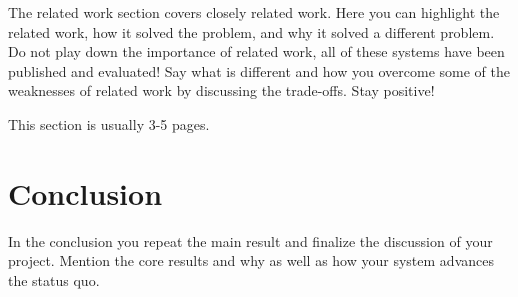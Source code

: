 \documentclass[a4paper,11pt,oneside]{report}
\begin{document}
The related work section covers closely related work. Here you can highlight
the related work, how it solved the problem, and why it solved a different
problem. Do not play down the importance of related work, all of these
systems have been published and evaluated! Say what is different and how
you overcome some of the weaknesses of related work by discussing the 
trade-offs. Stay positive!

This section is usually 3-5 pages.


\chapter{Conclusion}

In the conclusion you repeat the main result and finalize the discussion of
your project. Mention the core results and why as well as how your system
advances the status quo.

\cleardoublepage
{}
{}
\printbibliography

%
%
\end{document}
